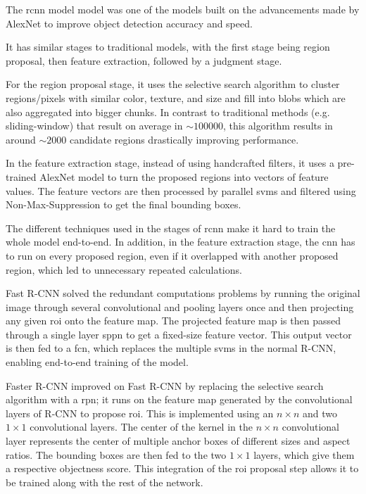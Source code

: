 The \gls{rcnn} model \cite{girshick_rich_2014} model was one of the models built on the advancements made by AlexNet to improve object detection accuracy and speed.

It has similar stages to traditional models, with the first stage being region proposal, then feature extraction, followed by a judgment stage.

For the region proposal stage, it uses the selective search algorithm \cite{uijlings_selective_2013} to cluster regions/pixels with similar color, texture, and size and fill into blobs which are also aggregated into bigger chunks. In contrast to traditional methods (e.g. sliding-window) that result on average in $\sim100000$, this algorithm results in around $\sim2000$ candidate regions \cite{wang_object_2021} drastically improving performance.

In the feature extraction stage, instead of using handcrafted filters, it uses a pre-trained AlexNet model to turn the proposed regions into vectors of feature values. The feature vectors are then processed by parallel \gls{svm}s and filtered using Non-Max-Suppression to get the final bounding boxes.

The different techniques used in the stages of \gls{rcnn} make it hard to train the whole model end-to-end. In addition, in the feature extraction stage, the \gls{cnn} has to run on every proposed region, even if it overlapped with another proposed region, which led to unnecessary repeated calculations.

Fast R-CNN \cite{girshick_fast_2015} solved the redundant computations problems by running the original image through several convolutional and pooling layers once and then projecting any given \gls{roi} onto the feature map. The projected feature map is then passed through a single layer \gls{sppn} to get a fixed-size feature vector. This output vector is then fed to a \gls{fcn}, which replaces the multiple \gls{svm}s in the normal R-CNN, enabling end-to-end training of the model.

Faster R-CNN \cite{ren_faster_2017} improved on Fast R-CNN by replacing the selective search algorithm with a \gls{rpn}; it runs on the feature map generated by the convolutional layers of R-CNN to propose \gls{roi}. This is implemented using an $n\times n$ and two $1\times 1$ convolutional layers. The center of the kernel in the $n \times n$ convolutional layer represents the center of multiple anchor boxes of different sizes and aspect ratios. The bounding boxes are then fed to the two $1\times 1$ layers, which give them a respective objectness score. This integration of the \gls{roi} proposal step allows it to be trained along with the rest of the network.

